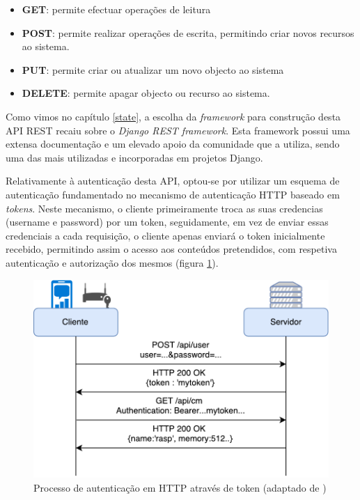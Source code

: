 \begin{itemize}
	\item \textbf{GET}: permite efectuar operações de leitura 
	\item \textbf{POST}: permite realizar operações de escrita, permitindo criar novos recursos ao sistema.
	\item \textbf{PUT}: permite criar ou atualizar um novo objecto ao sistema 
	\item \textbf{DELETE}: permite apagar objecto ou recurso ao sistema. 
\end{itemize}




Como vimos no capítulo \ref{state}, a escolha da \textit{framework} para construção desta \ac{API} \ac{REST} recaiu sobre o \textit{Django REST framework}. Esta framework possui uma extensa documentação e um elevado apoio da comunidade que a utiliza, sendo uma das mais utilizadas e incorporadas em projetos Django. 

Relativamente à autenticação desta \ac{API}, optou-se por utilizar um esquema de autenticação fundamentado no mecanismo de autenticação \ac{HTTP} baseado em \textit{tokens}\cite{tokenREST}. Neste mecanismo, o cliente primeiramente troca as suas credencias (username e password) por um token, seguidamente, em vez de enviar essas credenciais a cada requisição, o cliente apenas enviará o token inicialmente recebido, permitindo assim o acesso aos conteúdos pretendidos, com respetiva autenticação e autorização dos mesmos (figura \ref{autnetAPI}).


\begin{figure}[h]
	\centering
	\includegraphics[scale=0.61]{esquemas/autenticacaohttpesquema.pdf}
	\caption{Processo de autenticação em HTTP através de token (adaptado de \cite{AdoKukic2016})}
	\label{autnetAPI}
\end{figure}


